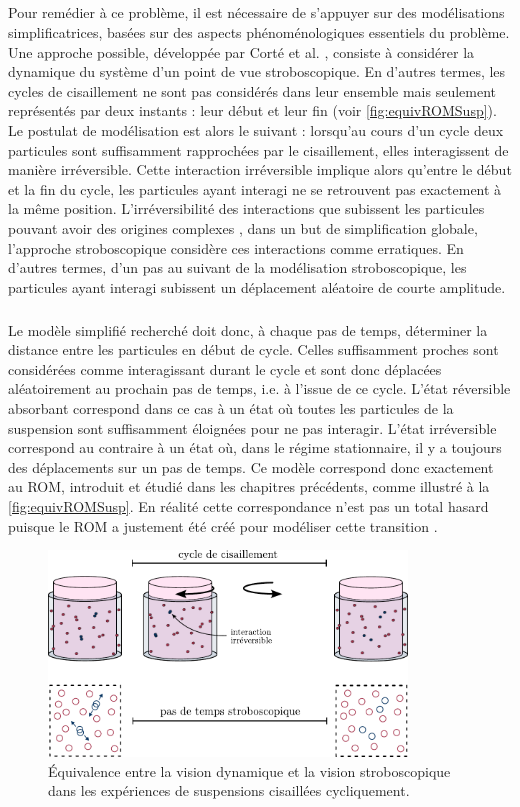 \subparagraph{}Pour remédier à ce problème, il est nécessaire de s'appuyer sur des modélisations simplificatrices, basées sur des aspects phénoménologiques essentiels du problème. Une approche possible, développée par Corté et al. \cite{corte_random_2008}, consiste à considérer la dynamique du système d'un point de vue stroboscopique. En d'autres termes, les cycles de cisaillement ne sont pas considérés dans leur ensemble mais seulement représentés par deux instants : leur début et leur fin (voir \autoref{fig:equivROMSusp}). Le postulat de modélisation est alors le suivant : lorsqu'au cours d'un cycle deux particules sont suffisamment rapprochées par le cisaillement, elles interagissent de manière irréversible. Cette interaction irréversible implique alors qu'entre le début et la fin du cycle, les particules ayant interagi ne se retrouvent pas exactement à la même position. L'irréversibilité des interactions que subissent les particules pouvant avoir des origines complexes \cite{drazer_microstructure_2004}, dans un but de simplification globale, l'approche stroboscopique considère ces interactions comme erratiques. En d'autres termes, d'un pas au suivant de la modélisation stroboscopique, les particules ayant interagi subissent un déplacement aléatoire de courte amplitude.

\subparagraph{}Le modèle simplifié recherché doit donc, à chaque pas de temps, déterminer la distance entre les particules en début de cycle. Celles suffisamment proches sont considérées comme interagissant durant le cycle et sont donc déplacées aléatoirement au prochain pas de temps, i.e. à l’issue de ce cycle. L'état réversible absorbant correspond dans ce cas à un état où toutes les particules de la suspension sont suffisamment éloignées pour ne pas interagir. L'état irréversible correspond au contraire à un état où, dans le régime stationnaire, il y a toujours des déplacements sur un pas de temps. Ce modèle correspond donc exactement au ROM, introduit et étudié dans les chapitres précédents, comme illustré à la \autoref{fig:equivROMSusp}. En réalité cette correspondance n'est pas un total hasard puisque le ROM a justement été créé pour modéliser cette transition \cite{corte_random_2008}.

\begin{figure}[h]
	\centering
	\includegraphics[width=0.85\textwidth]{Chapitre3/Figures/Method/equivROMSusp.pdf}
	\caption{Équivalence entre la vision dynamique et la vision stroboscopique dans les expériences de suspensions cisaillées cycliquement.}
	\label{fig:equivROMSusp}
\end{figure}

